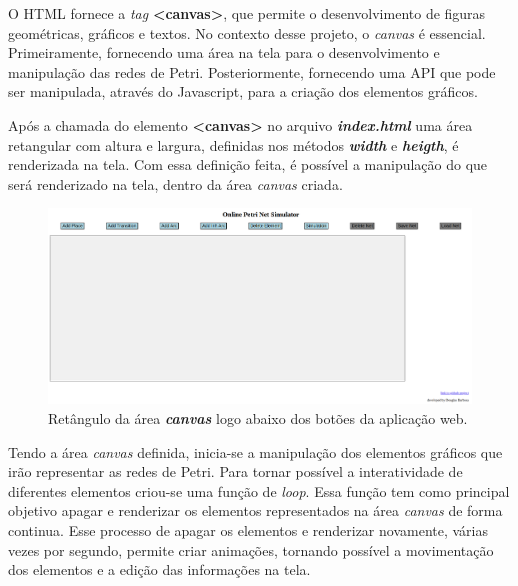 \documentclass[
	12pt,				%
	openright,			%
	oneside,			%
	a4paper,			%
	english,			%
	brazil				%
	]{abntex2}
\theoremstyle{doispontos}
\begin{document}
O HTML fornece a \textit{tag} \textbf{<canvas>}, que permite o desenvolvimento de figuras geométricas, gráficos e textos. No contexto desse projeto, o \textit{canvas} é essencial. Primeiramente, fornecendo uma área na tela para o desenvolvimento e manipulação das redes de Petri. Posteriormente, fornecendo uma API que pode ser manipulada, através do Javascript, para a criação dos elementos gráficos. 



Após a chamada do elemento \textbf{<canvas>} no arquivo \textbf{\textit{index.html}} uma área retangular com altura e largura, definidas nos métodos \textbf{\textit{width}} e \textbf{\textit{heigth}}, é renderizada na tela. Com essa definição feita, é possível a manipulação do que será renderizado na tela, dentro da área \textit{canvas} criada. 

\begin{figure}[ht] 
	\centering
	\includegraphics[scale=0.3]{figuras/area_canvas.png}
	\caption[Área canvas]{Retângulo da área \textit{\textbf{canvas}} logo abaixo dos botões da aplicação web.}
	\label{fig:area_canvas}
\end{figure}
\FloatBarrier

Tendo a área \textit{canvas} definida, inicia-se a manipulação dos elementos gráficos que irão representar as redes de Petri. Para tornar possível a interatividade de diferentes elementos criou-se uma função de \textit{loop}. Essa função tem como principal objetivo apagar e renderizar os elementos representados na área \textit{canvas} de forma continua. Esse processo de apagar os elementos e renderizar novamente, várias vezes por segundo, permite criar animações, tornando possível a movimentação dos elementos e a edição das informações na tela. 


\end{document}
